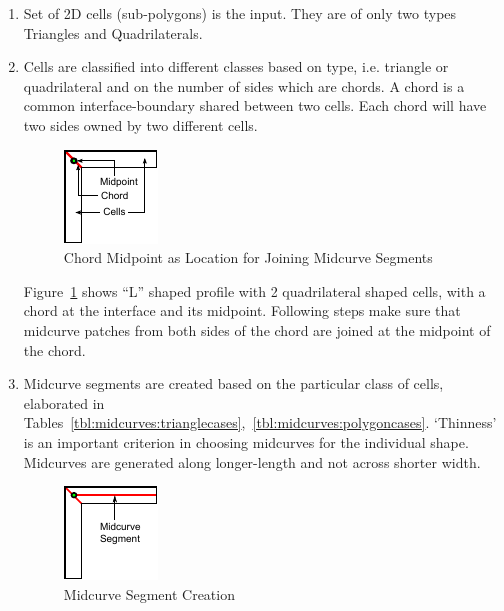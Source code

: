 \begin{enumerate} [noitemsep,topsep=2pt,parsep=2pt,partopsep=2pt]
\item Set of 2D cells (sub-polygons) is the input. They are of only two types Triangles and Quadrilaterals. 
\item Cells are classified into different classes based on type, i.e. triangle or quadrilateral and on the number of sides which are chords. A chord is a common interface-boundary shared between two cells. Each chord will have two sides owned by two different cells. 


\begin{figure}[h]
\centering \includegraphics[width=0.25\linewidth]{images/midcurve_polydecomp_2.pdf} 
\caption{Chord Midpoint as Location for Joining Midcurve Segments}
\label{fig_midcurvechords}
\end{figure}


Figure~\ref{fig_midcurvechords} shows ``L'' shaped profile with 2 quadrilateral shaped cells, with a chord at the interface and its midpoint. Following steps make sure that midcurve patches from both sides of the chord are joined at the midpoint of the chord.
\item Midcurve segments are created based on the particular class of cells, elaborated in Tables~\ref{tbl:midcurves:trianglecases},~\ref{tbl:midcurves:polygoncases}. `Thinness' is an important criterion in choosing midcurves for the individual shape. Midcurves are generated along longer-length and not across shorter width.


\begin{figure}[h]
\centering \includegraphics[width=0.25\linewidth]{images/midcurve_polymid_2.pdf} 
\caption{Midcurve Segment Creation}
\label{fig_polymid}
\end{figure}


\end{enumerate}

